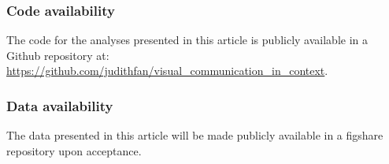 \documentclass[9pt,twocolumn,twoside]{pnas-new}
\begin{document}
\subsubsection*{Code availability} The code for the analyses presented in this article is publicly available in a Github repository at: \url{https://github.com/judithfan/visual_communication_in_context}.

\subsubsection*{Data availability} The data presented in this article will be made publicly available in a figshare repository upon acceptance.


\end{document}
